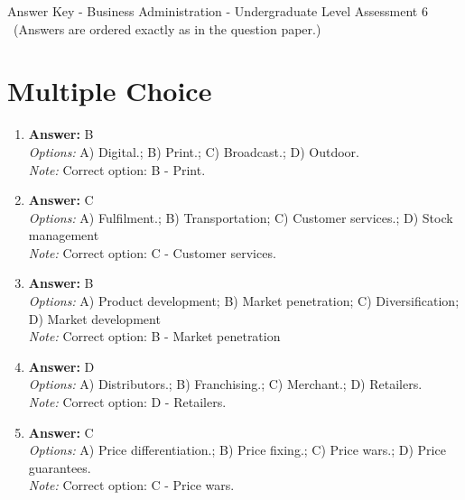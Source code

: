 \documentclass[12pt]{article}
\begin{document}
\begin{center}
Answer Key - Business Administration - Undergraduate Level Assessment 6 \
\small (Answers are ordered exactly as in the question paper.)
\end{center}

\section*{Multiple Choice}
\begin{enumerate}[label=\arabic*.]
\item \textbf{Answer:} B
\\ \textit{Options:} A) Digital.; B) Print.; C) Broadcast.; D) Outdoor.
\\ \textit{Note:} Correct option: B - Print.
\item \textbf{Answer:} C
\\ \textit{Options:} A) Fulfilment.; B) Transportation; C) Customer services.; D) Stock management
\\ \textit{Note:} Correct option: C - Customer services.
\item \textbf{Answer:} B
\\ \textit{Options:} A) Product development; B) Market penetration; C) Diversification; D) Market development
\\ \textit{Note:} Correct option: B - Market penetration
\item \textbf{Answer:} D
\\ \textit{Options:} A) Distributors.; B) Franchising.; C) Merchant.; D) Retailers.
\\ \textit{Note:} Correct option: D - Retailers.
\item \textbf{Answer:} C
\\ \textit{Options:} A) Price differentiation.; B) Price fixing.; C) Price wars.; D) Price guarantees.
\\ \textit{Note:} Correct option: C - Price wars.
\end{enumerate}
\end{document}
